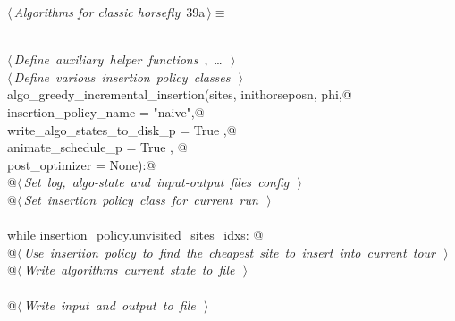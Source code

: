 \documentclass[11.5pt]{report}
\begin{document}
\begin{flushleft} \small\label{scrap46}\raggedright\small
{} $\langle\,${\itshape Algorithms for classic horsefly}\nobreak\ {\footnotesize {39a}}$\,\rangle\equiv$
\vspace{-1ex}
\begin{list}{}{} \item
\mbox{}\verb@@\\
\mbox{}\verb@@\hbox{$\langle\,${\itshape Define auxiliary helper functions}\nobreak\ {\footnotesize {}, \ldots\ }$\,\rangle$}\verb@@\\
\mbox{}\verb@@\hbox{$\langle\,${\itshape Define various insertion policy classes}\nobreak\ {\footnotesize {}}$\,\rangle$}\verb@@\\
\mbox{}\verb@def algo_greedy_incremental_insertion(sites, inithorseposn, phi,@\\
\mbox{}\verb@                                      insertion_policy_name       = "naive",@\\
\mbox{}\verb@                                      write_algo_states_to_disk_p = True   ,@\\
\mbox{}\verb@                                      animate_schedule_p          = True   , @\\
\mbox{}\verb@                                      post_optimizer              = None):@\\
\mbox{}\verb@      @\hbox{$\langle\,${\itshape Set log, algo-state and input-output files config}\nobreak\ {\footnotesize {}}$\,\rangle$}\verb@@\\
\mbox{}\verb@      @\hbox{$\langle\,${\itshape Set insertion policy class for current run}\nobreak\ {\footnotesize {}}$\,\rangle$}\verb@@\\
\mbox{}\verb@@\\
\mbox{}\verb@      while insertion_policy.unvisited_sites_idxs: @\\
\mbox{}\verb@         @\hbox{$\langle\,${\itshape Use insertion policy to find the cheapest site to insert into current tour}\nobreak\ {\footnotesize {}}$\,\rangle$}\verb@@\\
\mbox{}\verb@         @\hbox{$\langle\,${\itshape Write algorithms current state to file}\nobreak\ {\footnotesize {}}$\,\rangle$}\verb@@\\
\mbox{}\verb@@\\
\mbox{}\verb@      @\hbox{$\langle\,${\itshape Write input and output to file}\nobreak\ {\footnotesize {}}$\,\rangle$}\verb@@\\

\end{list}
\end{flushleft}
\end{document}
